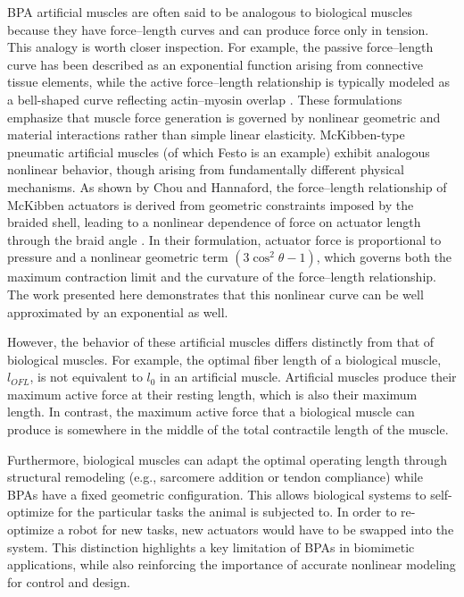 BPA artificial muscles are often said to be analogous to biological muscles because they have force--length curves and can produce force only in tension. This analogy is worth closer inspection. For example, the passive force–length curve has been described as an exponential function arising from connective tissue elements, while the active force–length relationship is typically modeled as a bell-shaped curve reflecting actin–myosin overlap \citep{winters1990}. These formulations emphasize that muscle force generation is governed by nonlinear geometric and material interactions rather than simple linear elasticity.
McKibben-type pneumatic artificial muscles (of which Festo is an example) exhibit analogous nonlinear behavior, though arising from fundamentally different physical mechanisms. As shown by Chou and Hannaford, the force–length relationship of McKibben actuators is derived from geometric constraints imposed by the braided shell, leading to a nonlinear dependence of force on actuator length through the braid angle \cite{chou_measurement_1996}. In their formulation, actuator force is proportional to pressure and a nonlinear geometric term $(3\cos^2\theta - 1)$, which governs both the maximum contraction limit and the curvature of the force–length relationship. The work presented here demonstrates that this nonlinear curve can be well approximated by an exponential as well.

However, the behavior of these artificial muscles differs distinctly from that of biological muscles.
For example, the optimal fiber length of a biological muscle, $l_{OFL}$, is not equivalent to $l_0$ in an artificial muscle. Artificial muscles produce their maximum active force at their resting length, which is also their maximum length. In contrast, the maximum active force that a biological muscle can produce is somewhere in the middle of the total contractile length of the muscle. 

Furthermore, biological muscles can adapt the optimal operating length through structural remodeling (e.g., sarcomere addition or tendon compliance) while BPAs have a fixed geometric configuration. This allows biological systems to self-optimize for the particular tasks the animal is subjected to. In order to re-optimize a robot for new tasks, new actuators would have to be swapped into the system. This distinction highlights a key limitation of BPAs in biomimetic applications, while also reinforcing the importance of accurate nonlinear modeling for control and design.

